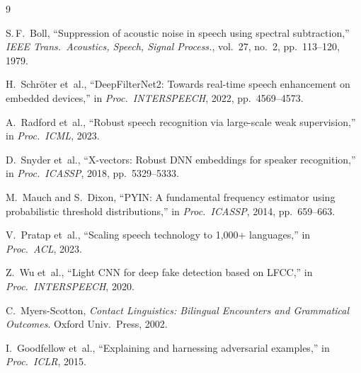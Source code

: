 \documentclass[conference]{IEEEtran}
\begin{document}
\begin{thebibliography}{9}

S.\,F.~Boll,
``Suppression of acoustic noise in speech using spectral subtraction,''
\textit{IEEE Trans.\ Acoustics, Speech, Signal Process.},
vol.~27, no.~2, pp.~113--120, 1979.

H.~Schr\"{o}ter et~al.,
``DeepFilterNet2: Towards real-time speech enhancement on embedded
devices,'' in \textit{Proc.\ INTERSPEECH}, 2022, pp.~4569--4573.

A.~Radford et~al.,
``Robust speech recognition via large-scale weak supervision,''
in \textit{Proc.\ ICML}, 2023.

D.~Snyder et~al.,
``X-vectors: Robust DNN embeddings for speaker recognition,''
in \textit{Proc.\ ICASSP}, 2018, pp.~5329--5333.

M.~Mauch and S.~Dixon,
``PYIN: A fundamental frequency estimator using probabilistic threshold
distributions,'' in \textit{Proc.\ ICASSP}, 2014, pp.~659--663.

V.~Pratap et~al.,
``Scaling speech technology to 1,000+ languages,''
in \textit{Proc.\ ACL}, 2023.

Z.~Wu et~al.,
``Light CNN for deep fake detection based on LFCC,''
in \textit{Proc.\ INTERSPEECH}, 2020.

C.~Myers-Scotton,
\textit{Contact Linguistics: Bilingual Encounters and Grammatical
Outcomes}.
Oxford Univ.\ Press, 2002.

I.~Goodfellow et~al.,
``Explaining and harnessing adversarial examples,''
in \textit{Proc.\ ICLR}, 2015.

\end{thebibliography}
\end{document}
